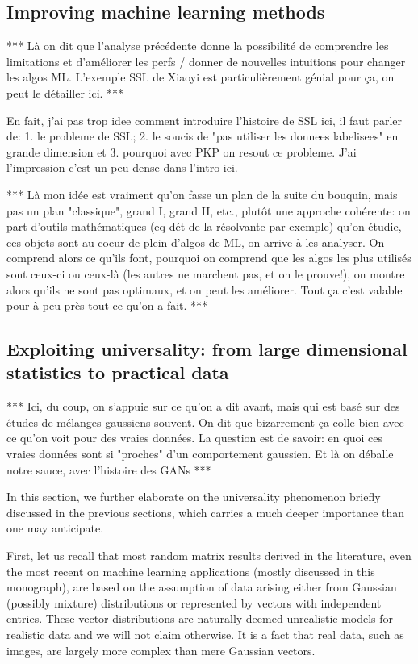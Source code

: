 \documentclass[MAL,biber]{nowfnt} %
\newcommand{\RED}{\color[rgb]{0.70,0,0}}
\newcommand{\BLUE}{\color[rgb]{0,0,0.69}}
\begin{document}
\subsection{Improving machine learning methods}

{\RED 
*** Là on dit que l'analyse précédente donne la possibilité de comprendre les limitations et d'améliorer les perfs / donner de nouvelles intuitions pour changer les algos ML. L'exemple SSL de Xiaoyi est particulièrement génial pour ça, on peut le détailler ici. ***}

{\BLUE 
En fait, j'ai pas trop idee comment introduire l'histoire de SSL ici, il faut parler de: 1. le probleme de SSL; 2. le soucis de "pas utiliser les donnees labelisees" en grande dimension et 3. pourquoi avec PKP on resout ce probleme. J'ai l'impression c'est un peu dense dans l'intro ici.
}

{\RED
*** Là mon idée est vraiment qu'on fasse un plan de la suite du bouquin, mais pas un plan "classique", grand I, grand II, etc., plutôt une approche cohérente: on part d'outils mathématiques (eq dét de la résolvante par exemple) qu'on étudie, ces objets sont au coeur de plein d'algos de ML, on arrive à les analyser. On comprend alors ce qu'ils font, pourquoi on comprend que les algos les plus utilisés sont ceux-ci ou ceux-là (les autres ne marchent pas, et on le prouve!), on montre alors qu'ils ne sont pas optimaux, et on peut les améliorer. Tout ça c'est valable pour à peu près tout ce qu'on a fait. ***
}



\subsection{Exploiting universality: from large dimensional statistics to practical data}

{\RED *** Ici, du coup, on s'appuie sur ce qu'on a dit avant, mais qui est basé sur des études de mélanges gaussiens souvent. On dit que bizarrement ça colle bien avec ce qu'on voit pour des vraies données. La question est de savoir: en quoi ces vraies données sont si "proches" d'un comportement gaussien. Et là on déballe notre sauce, avec l'histoire des GANs ***}

In this section, we further elaborate on the universality phenomenon briefly discussed in the previous sections, which carries a much deeper importance than one may anticipate.

\bigksip

First, let us recall that most random matrix results derived in the literature, even the most recent on machine learning applications (mostly discussed in this monograph), are based on the assumption of data arising either from Gaussian (possibly mixture) distributions or represented by vectors with independent entries. These vector distributions are naturally deemed unrealistic models for realistic data and we will not claim otherwise. It is a fact that real data, such as images, are largely more complex than mere Gaussian vectors.
\end{document}
